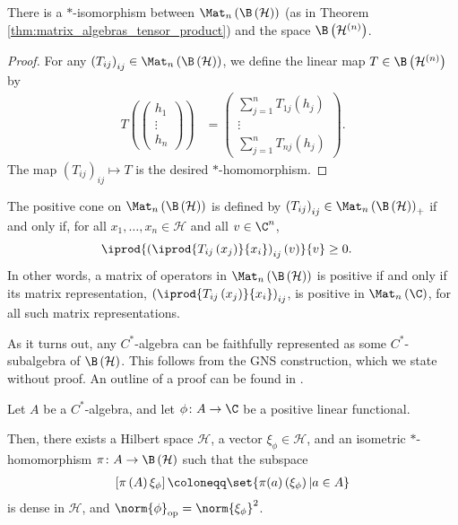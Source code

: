 \begin{theorem}
  There is a $\ast$-isomorphism between $\Mat_n\left( \B\left( \mathcal{H} \right) \right)$ (as in Theorem \ref{thm:matrix_algebras_tensor_product}) and the space $\B\left( \mathcal{H}^{(n)} \right)$.
\end{theorem}
\begin{proof}
  For any $\left( T_{ij} \right)_{ij}\in \Mat_n\left( \B\left( \mathcal{H} \right) \right)$, we define the linear map $T\in \B\left( \mathcal{H}^{(n)} \right)$ by
  \begin{align*}
    T\left( \begin{pmatrix}h_1\\\vdots\\h_n\end{pmatrix} \right) &= \begin{pmatrix}\sum_{j=1}^{n}T_{1j}\left( h_j \right) \\ \vdots \\ \sum_{j=1}^{n}T_{nj}\left( h_j \right)\end{pmatrix}.
  \end{align*}
  The map $\left( T_{ij} \right)_{ij} \mapsto T$ is the desired $\ast$-homomorphism.
\end{proof}
\begin{remark}
  The positive cone on $\Mat_n\left( \B\left( \mathcal{H} \right) \right)$ is defined by $\left( T_{ij} \right)_{ij}\in \Mat_n\left( \B\left( \mathcal{H} \right) \right)_{+}$ if and only if, for all $x_1,\dots,x_n\in \mathcal{H}$ and all $v\in \C^n$,
  \begin{align*}
    \iprod{\left( \iprod{T_{ij}\left( x_j \right)}{x_i} \right)_{ij} \left( v \right)}{v} &\geq 0.
  \end{align*}
  In other words, a matrix of operators in $\Mat_n\left( \B\left( \mathcal{H} \right) \right)$ is positive if and only if its matrix representation, $\left( \iprod{T_{ij}\left( x_j \right)}{x_i} \right)_{ij}$, is positive in $\Mat_n\left( \C \right)$, for all such matrix representations.
\end{remark}
As it turns out, any $C^{\ast}$-algebra can be faithfully represented as some $C^{\ast}$-subalgebra of $\B\left( \mathcal{H} \right)$. This follows from the GNS construction, which we state without proof. An outline of a proof can be found in \cite[Section II.6.4]{blackadar_operator_algebras}.
\begin{theorem}\label{thm:gns_construction}
  Let $A$ be a $C^{\ast}$-algebra, and let $\phi\colon A\rightarrow \C$ be a positive linear functional.\newline

  Then, there exists a Hilbert space $\mathcal{H}$, a vector $\xi_{\phi}\in \mathcal{H}$, and an isometric $\ast$-homomorphism $\pi\colon A\rightarrow \B\left( \mathcal{H} \right)$ such that the subspace
  \begin{align*}
    \left[ \pi\left( A \right)\xi_{\phi} \right] \coloneq \set{\pi(a)\left( \xi_{\phi} \right) | a\in A}
  \end{align*}
  is dense in $\mathcal{H}$, and $\norm{\phi}_{\op} = \norm{\xi_{\phi}}^2$.
\end{theorem}
